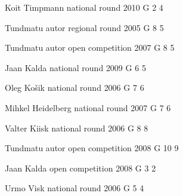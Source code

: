 \documentclass[11pt]{article}
\begin{document}
\ylDisplay{} %
{Koit Timpmann} %
{national round} %
{2010} %
{G 2} %
{4} %
{

\ifEngSolution
\fi
}

\ylDisplay{} %
{Tundmatu autor} %
{regional round} %
{2005} %
{G 8} %
{5} %
{

\ifEngSolution
\fi
}

\ylDisplay{} %
{Tundmatu autor} %
{open competition} %
{2007} %
{G 8} %
{5} %
{

\ifEngSolution
\fi
}

\ylDisplay{} %
{Jaan Kalda} %
{national round} %
{2009} %
{G 6} %
{5} %
{

\ifEngSolution
\fi
}

\ylDisplay{} %
{Oleg Košik} %
{national round} %
{2006} %
{G 7} %
{6} %
{

\ifEngSolution
\fi
}

\ylDisplay{} %
{Mihkel Heidelberg} %
{national round} %
{2007} %
{G 7} %
{6} %
{

\ifEngSolution
\fi
}

\ylDisplay{} %
{Valter Kiisk} %
{national round} %
{2006} %
{G 8} %
{8} %
{

\ifEngSolution
\fi
}

\ylDisplay{} %
{Tundmatu autor} %
{open competition} %
{2008} %
{G 10} %
{9} %
{

\ifEngSolution
\fi
}

\ylDisplay{} %
{Jaan Kalda} %
{open competition} %
{2008} %
{G 3} %
{2} %
{

\ifEngSolution
\fi
}

\ylDisplay{} %
{Urmo Visk} %
{national round} %
{2006} %
{G 5} %
{4} %
{

\ifEngSolution
\fi
}
\end{document}
